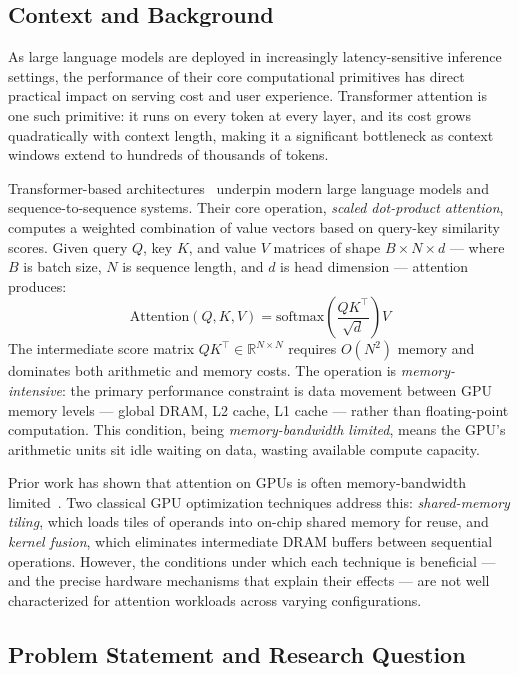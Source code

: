 \documentclass{article}
\begin{document}
\subsection{Context and Background}

As large language models are deployed in increasingly latency-sensitive
inference settings, the performance of their core computational primitives
has direct practical impact on serving cost and user experience. Transformer
attention is one such primitive: it runs on every token at every layer, and
its cost grows quadratically with context length, making it a significant
bottleneck as context windows extend to hundreds of thousands of tokens.

Transformer-based architectures~\cite{vaswani2017attention} underpin modern
large language models and sequence-to-sequence systems. Their core operation,
\textit{scaled dot-product attention}, computes a weighted combination of
value vectors based on query-key similarity scores. Given query $Q$, key $K$,
and value $V$ matrices of shape $B \times N \times d$ — where $B$ is batch
size, $N$ is sequence length, and $d$ is head dimension — attention produces:
\[
  \text{Attention}(Q,K,V)=
  \text{softmax}\!\left(\frac{QK^\top}{\sqrt{d}}\right)V
\]
The intermediate score matrix $QK^\top\in\mathbb{R}^{N\times N}$ requires
$O(N^2)$ memory and dominates both arithmetic and memory costs. The operation
is \textit{memory-intensive}: the primary performance constraint is data
movement between GPU memory levels — global DRAM, L2 cache, L1 cache — rather
than floating-point computation. This condition, being
\textit{memory-bandwidth limited}, means the GPU's arithmetic units sit idle
waiting on data, wasting available compute capacity.

Prior work has shown that attention on GPUs is often memory-bandwidth
limited~\cite{dao2022flashattention,wang2019characterizing}. Two classical
GPU optimization techniques address this: \textit{shared-memory tiling},
which loads tiles of operands into on-chip shared memory for reuse, and
\textit{kernel fusion}, which eliminates intermediate DRAM buffers between
sequential operations. However, the conditions under which each technique
is beneficial — and the precise hardware mechanisms that explain their effects
— are not well characterized for attention workloads across varying
configurations.

\subsection{Problem Statement and Research Question}
\end{document}
